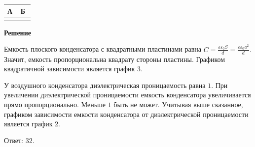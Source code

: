 \documentclass[12pt,a4paper]{article}
\begin{document}
{\begin{center}
\begin{minipage}[t]{.47\linewidth}
\begin{center}
\begin{tikzpicture}[book diagram,scale=.65,transform shape,>=stealth]
\end{tikzpicture}\end{center}
\end{minipage}\end{center}
\par
\begin{center}\small\setlength{\tabcolsep}{3pt}\begin{tabular}{|p{0.45\linewidth}|p{0.45\linewidth}|}\hline
А & Б\\\hline
 & \\\hline
\end{tabular}\end{center}\par
}{
\smallskip\noindent\textbf{Решение}\par
Емкость плоского конденсатора с квадратными пластинами равна $C= \frac{ \varepsilon\varepsilon_{0}S}{ d } = \frac{ \varepsilon\varepsilon_{0}a ^2 }{ d } .$ Значит, емкость пропорциональна квадрату стороны пластины. Графиком квадратичной зависимости является график $3$.\par
У воздушного конденсатора диэлектрическая проницаемость равна $1$. При увеличении диэлектрической проницаемости емкость конденсатора увеличивается прямо пропорционально. Меньше $1$ быть не может. Учитывая выше сказанное, графиком зависимости емкости конденсатора от диэлектрической проницаемости является график $2$.\par
Ответ: $32$.\par
}
\end{document}
